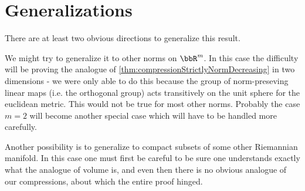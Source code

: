 \documentclass[a4paper,11pt]{article}
\begin{document}
\section{Generalizations}
There are at least two obvious directions to generalize this result.

We might try to generalize it to other norms on $\bbR^m$.  In this case the
difficulty will be proving the analogue of
\ref{thm:compressionStrictlyNormDecreasing} in two dimensions - we were only
able to do this because the group of norm-preseving linear maps (i.e. the
orthogonal group) acts transitively on the unit sphere for the euclidean
metric.  This would not be true for most other norms.  Probably the case $m=2$
will become another special case which will have to be handled more carefully.

Another possibility is to generalize to compact subsets of some other
Riemannian manifold.  In this case one must first be careful to be sure one
understands exactly what the analogue of volume is, and even then there is no
obvious analogue of our compressions, about which the entire proof hinged.
\end{document}
